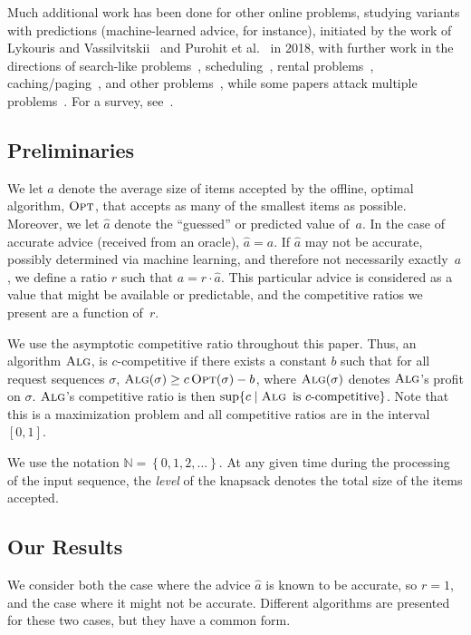 \documentclass[a4paper,UKenglish,cleveref, autoref, thm-restate]{lipics-v2021}
\newcommand{\ALG}{\ensuremath{\operatorname{\textsc{Alg}}}\xspace}
\newcommand{\OPT}{\ensuremath{\operatorname{\textsc{Opt}}}\xspace}
\newcommand{\SET}[1]{\left\{#1\right\}}
\newcommand{\NAT}{\ensuremath{\mathbb{N}}}
\newcommand{\guess}{\ensuremath{\hat{a}}\xspace}
\begin{document}
Much additional work has been done for other online problems, studying
variants with predictions (machine-learned advice, for instance),
initiated by the work of Lykouris and Vassilvitskii~\cite{LV18,LV21}
and Purohit et al.~\cite{PSK18} in 2018, with further work in the
directions of search-like
problems~\cite{A21,AKZ21,BCKP20,LHL19,LMHLSL21,MV17},
scheduling~\cite{AEMP22,AK21,BMRS20,IKQP21,KA18,LLMV20,LX21,M20},
rental problems~\cite{GP19,K19,WL20},
caching/paging~\cite{BCKPV22,IMMR20,JPS20,R20,W20}, and other
problems~\cite{AKS21,ACEPS20,AGKK20,BGGJ22,M21,RM21}, while some
papers attack multiple problems~\cite{ADJKR20,BMS20,LMRX21,WZ20}.  For
a survey, see~\cite{MV20}.

\subsection{Preliminaries}
We let $a$ denote the average size of items accepted by the offline,
optimal algorithm, \OPT, that accepts as many of the smallest items as
possible.  Moreover, we let $\guess$ denote the ``guessed'' or predicted
value of~$a$.  In the case of accurate advice (received from an
oracle), $\guess=a$.  If $\guess$ may not be accurate, possibly determined via machine learning, and
therefore not necessarily exactly~$a$, we define a ratio $r$ such that
$a = r \cdot \guess$.  This particular advice is considered as a value that
might be available or predictable, and the competitive ratios we
present are a function of~$r$.

We use the asymptotic competitive ratio throughout this paper.  Thus,
an algorithm \ALG, is $c$-competitive if there exists a constant $b$
such that for all request sequences $\sigma$,
$\ALG(\sigma) \geq c\OPT(\sigma)-b$, where $\ALG(\sigma)$ denotes
\ALG's profit on $\sigma$.  \ALG's competitive ratio is then
$\sup \{ c\mid \ALG \mbox{\rm ~is~}c\mbox{\rm -competitive}\}$.  Note
that this is a maximization problem and all competitive ratios are in
the interval~$[0,1]$.

We use the notation $\NAT=\SET{0, 1, 2, \ldots}$.  At any given time
during the processing of the input sequence, the {\em level} of the
knapsack denotes the total size of the items accepted.

\subsection{Our Results}
We consider both the case where the advice $\guess$ is known to be accurate, so $r=1$,
and the case where it might not be accurate. Different algorithms are
presented for these two cases, but they have a common form.
\end{document}
